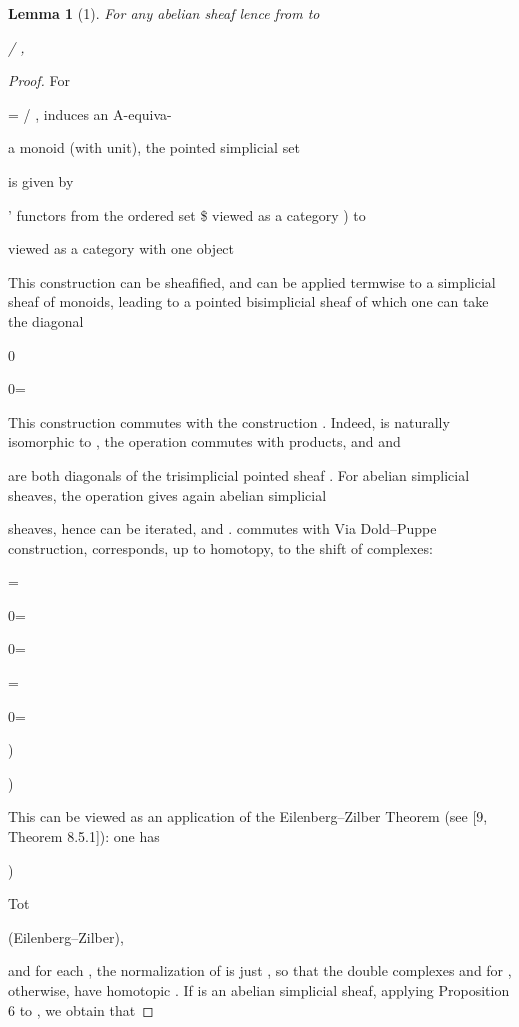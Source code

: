 \documentclass[11pt,a4paper]{article}
\theoremstyle{plain}
\newtheorem{lemma}[theorem]{Lemma}
\theoremstyle{definition}
\begin{document}
\begin{lemma}[1]
For any abelian sheaf
lence from
to

/ ,

\end{lemma}

\begin{proof} For


= / , induces an A-equiva-

a monoid (with unit), the pointed simplicial set 

is given by

' functors from the ordered set   \$ viewed as a category )
to

viewed as a category with one object

This construction can be sheafified, and can be applied termwise to a simplicial
sheaf of monoids, leading to a pointed bisimplicial sheaf of which one can take the
diagonal

0  



0=  

This construction commutes with the construction 
  . Indeed,  
is naturally isomorphic to  , the operation  commutes with products, and
  and

 are both diagonals of the trisimplicial pointed sheaf
  .
For abelian simplicial sheaves, the operation
gives again abelian simplicial

sheaves, hence can be iterated, and
.
 commutes with
Via Dold--Puppe construction, corresponds, up to homotopy, to the shift
of
complexes:

=

0=  

0= 

=



0=

)





 ) 

This can be viewed as an application of the Eilenberg--Zilber Theorem (see
[9, Theorem 8.5.1]): one has

)





 Tot

(Eilenberg--Zilber),



and for each
, the normalization of 
is just
, so that the double
complexes
and 
for
, otherwise, have homotopic
.
If  is an abelian simplicial sheaf, applying Proposition 6 to   , we obtain
that




\end{proof}
\end{document}

